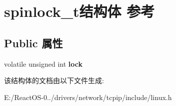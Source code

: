 \hypertarget{structspinlock__t}{}\section{spinlock\+\_\+t结构体 参考}
\label{structspinlock__t}
\subsection*{Public 属性}
\begin{DoxyCompactItemize}
\item 
\mbox{\label{structspinlock__t_a5ae085550532a212e982000315bb4b73}} 
volatile unsigned int {\bfseries lock}
\end{DoxyCompactItemize}


该结构体的文档由以下文件生成\+:\begin{DoxyCompactItemize}
\item 
E\+:/\+React\+O\+S-\/0../drivers/network/tcpip/include/linux.\+h\end{DoxyCompactItemize}
